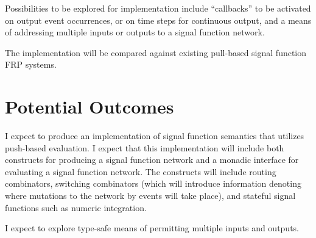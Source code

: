 \documentclass[11pt]{artikel3}
\begin{document}
Possibilities to be explored for implementation include ``callbacks'' to be activated on output event occurrences, or on time
steps for continuous output, and a means of addressing multiple inputs or outputs to a signal function network.

The implementation will be compared against existing pull-based signal function FRP systems.

\section{Potential Outcomes}

I expect to produce an implementation of signal function semantics that utilizes push-based evaluation. I expect that this implementation will include both constructs for producing a signal function network and a monadic interface for evaluating a signal function network. The constructs will include routing combinators, switching combinators (which will introduce information denoting where mutations to the network by events will take place), and stateful signal functions such as
numeric integration.

I expect to explore type-safe means of permitting multiple inputs and outputs.

{}

\end{document}
